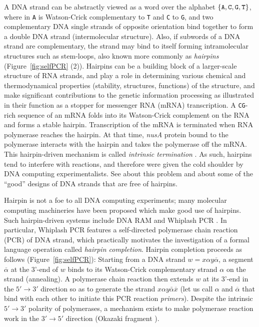 \documentclass{article}
\theoremstyle{plain}
\theoremstyle{remark}
\newcommand{\calpha}{\ensuremath{\overline{\alpha}}}
\begin{document}
A DNA strand can be abstractly viewed as a word over the alphabet $\{{\tt A}, {\tt C}, {\tt G}, {\tt T}\}$, where in {\tt A} is Watson-Crick complementary to {\tt T} and {\tt C} to {\tt G}, and two complementary DNA single strands of opposite orientation bind together to form a double DNA strand (intermolecular structure). 
Also, if subwords of a DNA strand are complementary, the strand may bind to itself forming intramolecular structures such as stem-loops, also known more commonly as {\it hairpins} (Figure~\ref{fig:selfPCR} (2)). 
Hairpins can be a building block of a larger-scale structure of RNA strands, and play a role in determining various chemical and thermodynamical properties (stability, structures, functions) of the structure, and make significant contributions to the genetic information processing as illustrated in their function as a stopper for messenger RNA (mRNA) transcription. 
A {\tt CG}-rich sequence of an mRNA folds into its Watson-Crick complement on the RNA and forms a stable hairpin. 
Transcription of the mRNA is terminated when RNA polymerase reaches the hairpin. 
At that time, {\it nusA} protein bound to the polymerase interacts with the hairpin and takes the polymerase off the mRNA. 
This hairpin-driven mechanism is called {\it intrinsic termination} \cite{WilsonHippel95}. 
As such, hairpins tend to interfere with reactions, and therefore were given the cold shoulder by DNA computing experimentalists. 
See \cite{Adleman94, AritaKobayashi02, JoKeMa02, JonoskaMahalingam04, KaKoLoSoTh06, PaRoYo01} about this problem and about some of the ``good'' designs of DNA strands that are free of hairpins. 

Hairpin is not a foe to all DNA computing experiments; many molecular computing machineries have been proposed which make good use of hairpins. 
Such hairpin-driven systems include DNA RAM \cite{KaYaOhYaHa08, TakinoueSuyama04, TakinoueSuyama06} and Whiplash PCR \cite{HAKSY00, SKKGYISH99}. 
In particular, Whiplash PCR features a self-directed polymerase chain reaction (PCR) of DNA strand, which practically motivates the investigation of a formal language operation called {\it hairpin completion}. 
Hairpin completion proceeds as follows (Figure~\ref{fig:selfPCR}): 
Starting from a DNA strand $w = x\alpha y \calpha$, a segment $\calpha$ at the 3'-end of $w$ binds to its Watson-Crick complementary strand $\alpha$ on the strand (annealing). 
A polymerase chain reaction then extends $w$ at its 3'-end in the $5' \to 3'$ direction so as to generate the strand $x\alpha y \bar{\alpha} \overline{x}$ (let us call $\alpha$ and $\calpha$ that bind with each other to initiate this PCR reaction {\it primers}). 
Despite the intrinsic $5' \to 3'$ polarity of polymerases, a mechanism exists to make polymerase reaction work in the $3' \to 5'$ direction (Okazaki fragment \cite{OkOkSaSuSu68}). 
\end{document}

